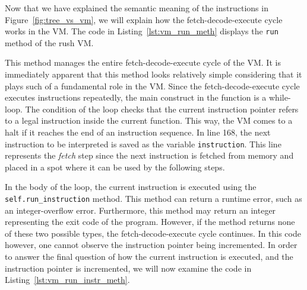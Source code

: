 Now that we have explained the semantic meaning of the instructions in Figure~\ref{fig:tree_vs_vm}, we will explain how the fetch-decode-execute cycle works in the VM\@.
The code in Listing~\ref{lst:vm_run_meth} displays the \texttt{run} method of the rush VM\@.


This method manages the entire fetch-decode-execute cycle of the VM\@.
It is immediately apparent that this method looks relatively simple considering that it plays such of a fundamental role in the VM\@.
Since the fetch-decode-execute cycle executes instructions repeatedly, the main construct in the function is a while-loop.
The condition of the loop checks that the current instruction pointer refers to a legal instruction inside the current function.
This way, the VM comes to a halt if it reaches the end of an instruction sequence.
In line 168, the next instruction to be interpreted is saved as the variable \texttt{instruction}.
This line represents the \emph{fetch} step since the next instruction is fetched from memory and placed in a spot where it can be used by the following steps.

In the body of the loop, the current instruction is executed using the \texttt{self.run\_instruction} method.
This method can return a runtime error, such as an integer-overflow error.
Furthermore, this method may return an integer representing the exit code of the program.
However, if the method returns none of these two possible types, the fetch-decode-execute cycle continues.
In this code however, one cannot observe the instruction pointer being incremented.
In order to answer the final question of how the current instruction is executed, and the instruction pointer is incremented, we will now examine the code in Listing~\ref{lst:vm_run_instr_meth}.



